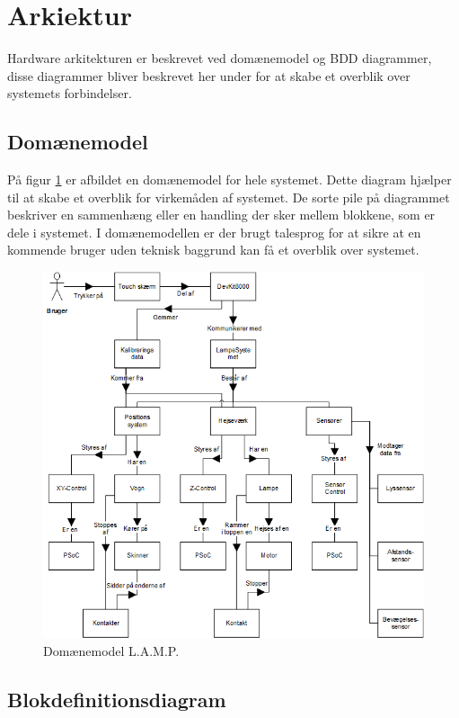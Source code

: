 \section{Arkiektur}

Hardware arkitekturen er beskrevet ved domænemodel og BDD diagrammer, disse diagrammer bliver beskrevet her under for at skabe et overblik over systemets forbindelser.


\subsection{Domænemodel}

På figur \ref{fig:dmLAMP} er afbildet en domænemodel for hele systemet. Dette diagram hjælper til at skabe et overblik for virkemåden af systemet. De sorte pile på diagrammet beskriver en sammenhæng eller en handling der sker mellem blokkene, som er dele i systemet. I domænemodellen er der brugt talesprog for at sikre at en kommende bruger uden teknisk baggrund kan få et overblik over systemet.

\begin{figure}[H] \centering
    \includegraphics[width=\textwidth]{Filer/dmLAMP.png}
    \caption{Domænemodel L.A.M.P.}
    \label{fig:dmLAMP}
\end{figure}


\subsection{Blokdefinitionsdiagram}


